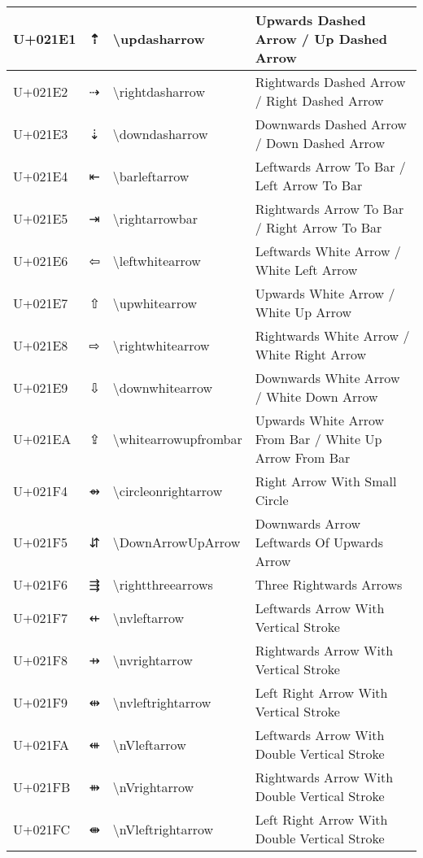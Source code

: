 \begin{table}[h]
\begin{tabulary}{\linewidth}{|L|L|L|L|}
\hline
U+021E1 & ⇡ & {\textbackslash}updasharrow & Upwards Dashed Arrow / Up Dashed Arrow \\
\hline
U+021E2 & ⇢ & {\textbackslash}rightdasharrow & Rightwards Dashed Arrow / Right Dashed Arrow \\
\hline
U+021E3 & ⇣ & {\textbackslash}downdasharrow & Downwards Dashed Arrow / Down Dashed Arrow \\
\hline
U+021E4 & ⇤ & {\textbackslash}barleftarrow & Leftwards Arrow To Bar / Left Arrow To Bar \\
\hline
U+021E5 & ⇥ & {\textbackslash}rightarrowbar & Rightwards Arrow To Bar / Right Arrow To Bar \\
\hline
U+021E6 & ⇦ & {\textbackslash}leftwhitearrow & Leftwards White Arrow / White Left Arrow \\
\hline
U+021E7 & ⇧ & {\textbackslash}upwhitearrow & Upwards White Arrow / White Up Arrow \\
\hline
U+021E8 & ⇨ & {\textbackslash}rightwhitearrow & Rightwards White Arrow / White Right Arrow \\
\hline
U+021E9 & ⇩ & {\textbackslash}downwhitearrow & Downwards White Arrow / White Down Arrow \\
\hline
U+021EA & ⇪ & {\textbackslash}whitearrowupfrombar & Upwards White Arrow From Bar / White Up Arrow From Bar \\
\hline
U+021F4 & ⇴ & {\textbackslash}circleonrightarrow & Right Arrow With Small Circle \\
\hline
U+021F5 & ⇵ & {\textbackslash}DownArrowUpArrow & Downwards Arrow Leftwards Of Upwards Arrow \\
\hline
U+021F6 & ⇶ & {\textbackslash}rightthreearrows & Three Rightwards Arrows \\
\hline
U+021F7 & ⇷ & {\textbackslash}nvleftarrow & Leftwards Arrow With Vertical Stroke \\
\hline
U+021F8 & ⇸ & {\textbackslash}nvrightarrow & Rightwards Arrow With Vertical Stroke \\
\hline
U+021F9 & ⇹ & {\textbackslash}nvleftrightarrow & Left Right Arrow With Vertical Stroke \\
\hline
U+021FA & ⇺ & {\textbackslash}nVleftarrow & Leftwards Arrow With Double Vertical Stroke \\
\hline
U+021FB & ⇻ & {\textbackslash}nVrightarrow & Rightwards Arrow With Double Vertical Stroke \\
\hline
U+021FC & ⇼ & {\textbackslash}nVleftrightarrow & Left Right Arrow With Double Vertical Stroke \\

\end{tabulary}
\end{table}
